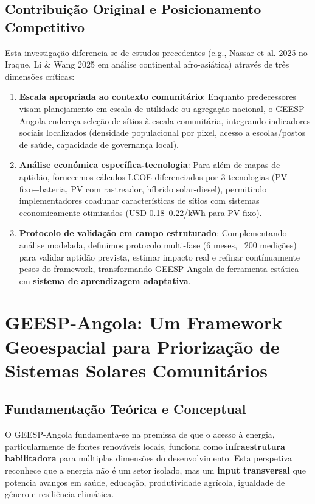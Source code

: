 \documentclass[12pt, a4paper]{article}
\begin{document}
\subsection{Contribuição Original e Posicionamento Competitivo}

Esta investigação diferencia-se de estudos precedentes (e.g., Nassar et al. 2025 no Iraque, Li \& Wang 2025 em análise continental afro-asiática) através de três dimensões críticas:

\begin{enumerate}
\item \textbf{Escala apropriada ao contexto comunitário}: Enquanto predecessores visam planejamento em escala de utilidade ou agregação nacional, o GEESP-Angola endereça seleção de sítios à escala comunitária, integrando indicadores sociais localizados (densidade populacional por pixel, acesso a escolas/postos de saúde, capacidade de governança local).

\item \textbf{Análise económica específica-tecnologia}: Para além de mapas de aptidão, fornecemos cálculos LCOE diferenciados por 3 tecnologias (PV fixo+bateria, PV com rastreador, híbrido solar-diesel), permitindo implementadores coadunar características de sítios com sistemas economicamente otimizados (USD 0.18--0.22/kWh para PV fixo).

\item \textbf{Protocolo de validação em campo estruturado}: Complementando análise modelada, definimos protocolo multi-fase (6 meses, ~200 medições) para validar aptidão prevista, estimar impacto real e refinar contínuamente pesos do framework, transformando GEESP-Angola de ferramenta estática em \textbf{sistema de aprendizagem adaptativa}.
\end{enumerate}

\section{GEESP-Angola: Um Framework Geoespacial para Priorização de Sistemas Solares Comunitários}

\subsection{Fundamentação Teórica e Conceptual}

O GEESP-Angola fundamenta-se na premissa de que o acesso à energia, particularmente de fontes renováveis locais, funciona como \textbf{infraestrutura habilitadora} para múltiplas dimensões do desenvolvimento. Esta perspetiva reconhece que a energia não é um setor isolado, mas um \textbf{input transversal} que potencia avanços em saúde, educação, produtividade agrícola, igualdade de género e resiliência climática.
\end{document}
